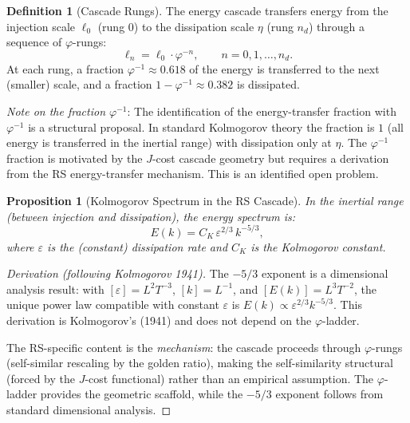 \documentclass[12pt,a4paper]{article}
\newtheorem{proposition}[theorem]{Proposition}
\theoremstyle{definition}
\newtheorem{definition}[theorem]{Definition}
\theoremstyle{remark}
\begin{document}
\begin{definition}[Cascade Rungs]
The energy cascade transfers energy from the injection scale
$\ell_0$ (rung 0) to the dissipation scale $\eta$ (rung $n_d$)
through a sequence of $\varphi$-rungs:
\begin{equation}
  \ell_n = \ell_0 \cdot \varphi^{-n},
  \qquad n = 0, 1, \ldots, n_d.
\end{equation}
At each rung, a fraction $\varphi^{-1} \approx 0.618$ of the
energy is transferred to the next (smaller) scale, and a fraction
$1 - \varphi^{-1} \approx 0.382$ is dissipated.

\emph{Note on the fraction $\varphi^{-1}$}: The identification of the
energy-transfer fraction with $\varphi^{-1}$ is a structural proposal.
In standard Kolmogorov theory the fraction is $1$ (all energy is
transferred in the inertial range) with dissipation only at $\eta$.
The $\varphi^{-1}$ fraction is motivated by the $J$-cost cascade
geometry but requires a derivation from the RS energy-transfer
mechanism.  This is an identified open problem.
\end{definition}

\begin{proposition}[Kolmogorov Spectrum in the RS Cascade]
\label{thm:kolmogorov}
In the inertial range (between injection and dissipation), the
energy spectrum is:
\begin{equation}
  \boxed{E(k) = C_K\,\varepsilon^{2/3}\,k^{-5/3},}
\end{equation}
where $\varepsilon$ is the (constant) dissipation rate and $C_K$
is the Kolmogorov constant.
\end{proposition}

\begin{proof}[Derivation (following Kolmogorov 1941)]
The $-5/3$ exponent is a dimensional analysis result: with
$[\varepsilon] = L^2 T^{-3}$, $[k] = L^{-1}$, and
$[E(k)] = L^3 T^{-2}$, the unique power law compatible with
constant $\varepsilon$ is $E(k) \propto \varepsilon^{2/3}k^{-5/3}$.
This derivation is Kolmogorov's (1941) and does not depend on the
$\varphi$-ladder.

The RS-specific content is the \emph{mechanism}: the cascade
proceeds through $\varphi$-rungs (self-similar rescaling by the
golden ratio), making the self-similarity structural (forced by
the $J$-cost functional) rather than an empirical assumption.
The $\varphi$-ladder provides the geometric scaffold, while the
$-5/3$ exponent follows from standard dimensional analysis.
\end{proof}
\end{document}
